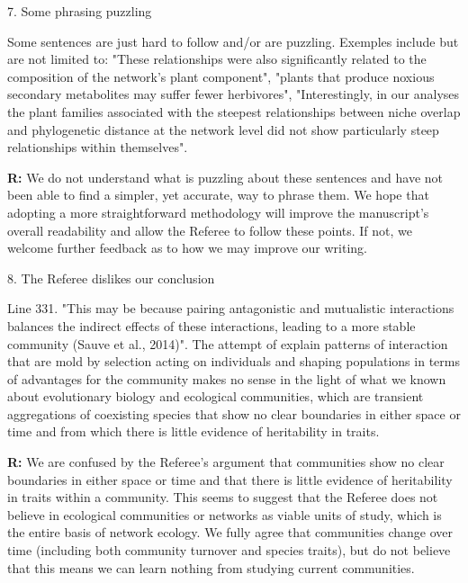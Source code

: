 \documentclass[12pt]{letter}
\newenvironment{refquote}{\bigskip \begin{it}}{\end{it}\smallskip}
\begin{document}
  7. Some phrasing puzzling 

    \begin{refquote}

      Some sentences are just hard to follow and/or are puzzling. Exemples include but are not limited to: "These relationships were also significantly related to the composition of the network’s plant component", "plants that produce noxious secondary metabolites may suffer fewer herbivores", "Interestingly, in our analyses the plant families associated with the steepest relationships between niche overlap and phylogenetic distance at the network level did not show particularly steep relationships within themselves".

    \end{refquote}


    \textbf{R:} We do not understand what is puzzling about these sentences and have not been able to find a simpler, yet accurate, way to phrase them. We hope that adopting a more straightforward methodology will improve the manuscript's overall readability and allow the Referee to follow these points. If not, we welcome further feedback as to how we may improve our writing.


  8. The Referee dislikes our conclusion

    \begin{refquote}

      Line 331. "This may be because pairing antagonistic and mutualistic interactions balances the indirect effects of these interactions, leading to a more stable community (Sauve et al., 2014)". The attempt of explain patterns of interaction that are mold by selection acting on individuals and shaping populations in terms of advantages for the community makes no sense in the light of what we known about evolutionary biology and ecological communities, which are transient aggregations of coexisting species that show no clear boundaries in either space or time and from which there is little evidence of heritability in traits.

      \end{refquote}

      \textbf{R:} We are confused by the Referee's argument that communities show no clear boundaries in either space or time and that there is little evidence of heritability in traits within a community. This seems to suggest that the Referee does not believe in ecological communities or networks as viable units of study, which is the entire basis of network ecology. We fully agree that communities change over time (including both community turnover and species traits), but do not believe that this means we can learn nothing from studying current communities.
\end{document}
